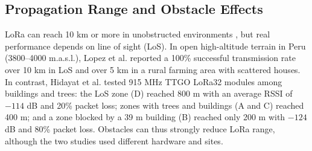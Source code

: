 \documentclass[conference]{IEEEtran}
\begin{document}
\subsection{Propagation Range and Obstacle Effects}
LoRa can reach 10 km or more in unobstructed environments \cite{dajnowski2024, murdyantoro2019}, but real performance depends on line of sight (LoS). In open high-altitude terrain in Peru (3800--4000 m.a.s.l.), Lopez et al. \cite{lopez2025} reported a 100\% successful transmission rate over 10 km in LoS and over 5 km in a rural farming area with scattered houses. In contrast, Hidayat et al. \cite{hidayat2019} tested 915 MHz TTGO LoRa32 modules among buildings and trees: the LoS zone (D) reached 800 m with an average RSSI of $-114$ dB and 20\% packet loss; zones with trees and buildings (A and C) reached 400 m; and a zone blocked by a 39 m building (B) reached only 200 m with $-124$ dB and 80\% packet loss. Obstacles can thus strongly reduce LoRa range, although the two studies used different hardware and sites.
\end{document}
